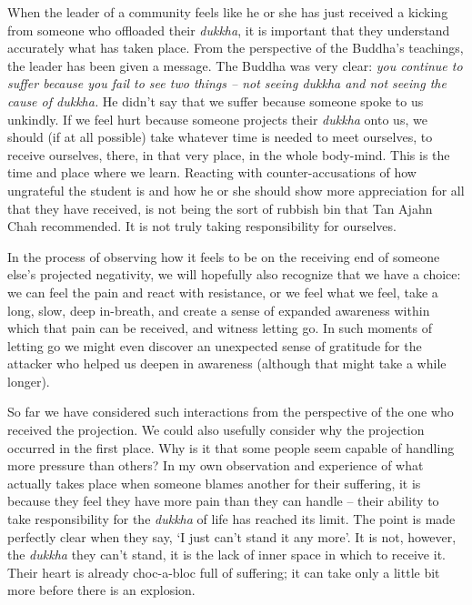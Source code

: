 When the leader of a community feels like he or she has just received a
kicking from someone who offloaded their \emph{dukkha}, it is important
that they understand accurately what has taken place. From the
perspective of the Buddha's teachings, the leader has been given a
message. The Buddha was very clear: \emph{you continue to suffer because
you fail to see two things -- not seeing dukkha and not seeing the cause
of dukkha.} He didn't say that we suffer because someone spoke to us
unkindly. If we feel hurt because someone projects their \emph{dukkha}
onto us, we should (if at all possible) take whatever time is needed to
meet ourselves, to receive ourselves, there, in that very place, in the
whole body-mind. This is the time and place where we learn. Reacting
with counter-accusations of how ungrateful the student is and how he or
she should show more appreciation for all that they have received, is
not being the sort of rubbish bin that Tan Ajahn Chah recommended. It is
not truly taking responsibility for ourselves.

In the process of observing how it feels to be on the receiving end of
someone else's projected negativity, we will hopefully also recognize
that we have a choice: we can feel the pain and react with resistance,
or we feel what we feel, take a long, slow, deep in-breath, and create a
sense of expanded awareness within which that pain can be received, and
witness letting go. In such moments of letting go we might even discover
an unexpected sense of gratitude for the attacker who helped us deepen
in awareness (although that might take a while longer).

So far we have considered such interactions from the perspective of the
one who received the projection. We could also usefully consider why the
projection occurred in the first place. Why is it that some people seem
capable of handling more pressure than others? In my own observation and
experience of what actually takes place when someone blames another for
their suffering, it is because they feel they have more pain than they
can handle -- their ability to take responsibility for the \emph{dukkha}
of life has reached its limit. The point is made perfectly clear when
they say, `I just can't stand it any more'. It is not, however, the
\emph{dukkha} they can't stand, it is the lack of inner space in which
to receive it. Their heart is already choc-a-bloc full of suffering; it
can take only a little bit more before there is an explosion.

